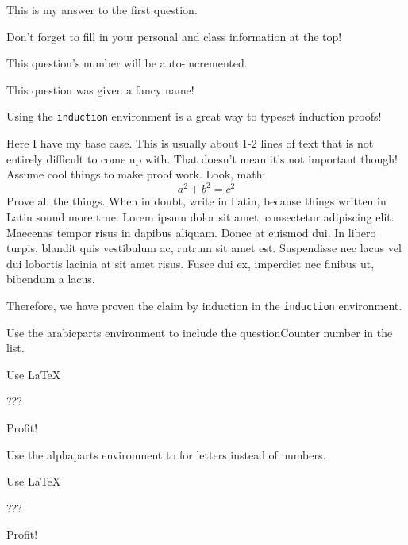 \documentclass[11pt]{homework}
\begin{document}
\maketitle

\question
  This is my answer to the first question.

  Don't forget to fill in your personal and class information at the top!

  \lipsum[1]

\question
  This question's number will be auto-incremented.

  \lipsum[2]

  This question was given a fancy name!

  \lipsum[3]

\newpage
\question
  Using the \texttt{induction} environment is a great way to typeset induction proofs!
  \begin{induction}
    \basecase
      Here I have my base case.
      This is usually about 1-2 lines of text that is not entirely difficult to come up with.
      That doesn't mean it's not important though!
    \indhyp
      Assume cool things to make proof work. Look, math:
      \[a^2 + b^2 = c^2\]
    \indstep
      Prove all the things.  When in doubt, write in Latin, because things
      written in Latin sound more true.  Lorem ipsum dolor sit amet, consectetur
      adipiscing elit. Maecenas tempor risus in dapibus aliquam. Donec at
      euismod dui. In libero turpis, blandit quis vestibulum ac, rutrum sit amet
      est. Suspendisse nec lacus vel dui lobortis lacinia at sit amet risus.
      Fusce dui ex, imperdiet nec finibus ut, bibendum a lacus.
  \end{induction}

  Therefore, we have proven the claim by induction in the \texttt{induction} environment.

\question
  Use the arabicparts environment to include the questionCounter number in the list.
  \begin{arabicparts}
    \item Use \LaTeX
    \item ???
    \item Profit!
  \end{arabicparts}

  \lipsum[7]

\question
  Use the alphaparts environment to for letters instead of numbers.
  \begin{alphaparts}
    \item
      Use \LaTeX

      \lipsum[8]
    \item ???
    \item Profit!
  \end{alphaparts}
\end{document}
